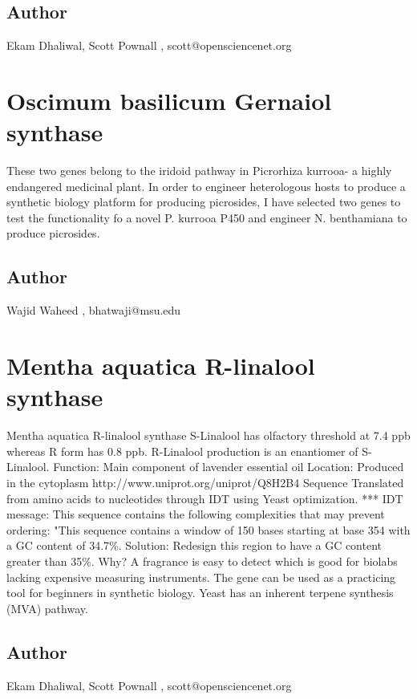 \documentclass{article}%
\begin{document}
\subsection{Author}%
Ekam Dhaliwal, Scott Pownall%
,%
scott@opensciencenet.org

%
\section{Oscimum basilicum Gernaiol synthase}%
These two genes belong to the iridoid pathway in Picrorhiza kurrooa{-} a highly endangered medicinal plant. In order to engineer heterologous hosts to produce a synthetic biology platform for producing picrosides, I have selected two genes to test the functionality fo a novel P. kurrooa P450 and engineer N. benthamiana to produce picrosides.%
\subsection{Author}%
Wajid Waheed%
,%
bhatwaji@msu.edu

%
\section{Mentha aquatica R{-}linalool synthase}%
Mentha aquatica R{-}linalool synthase\newline%
S{-}Linalool has olfactory threshold at 7.4 ppb whereas R form has 0.8 ppb. R{-}Linalool production is an enantiomer of S{-}Linalool. \newline%
Function: Main component of lavender essential oil \newline%
Location: Produced in the cytoplasm \newline%
http://www.uniprot.org/uniprot/Q8H2B4\newline%
Sequence Translated from amino acids to nucleotides through IDT using Yeast optimization.\newline%
*** IDT message: This sequence contains the following complexities that may prevent ordering: "This sequence contains a window of 150 bases starting at base 354 with a GC content of 34.7\%. Solution: Redesign this region to have a GC content greater than 35\%.\newline%
Why? A fragrance is easy to detect which is good for biolabs lacking expensive measuring instruments. The gene can be used as a practicing tool for beginners in synthetic biology. Yeast has an inherent terpene synthesis (MVA) pathway. %
\subsection{Author}%
Ekam Dhaliwal, Scott Pownall%
,%
scott@opensciencenet.org
\end{document}
